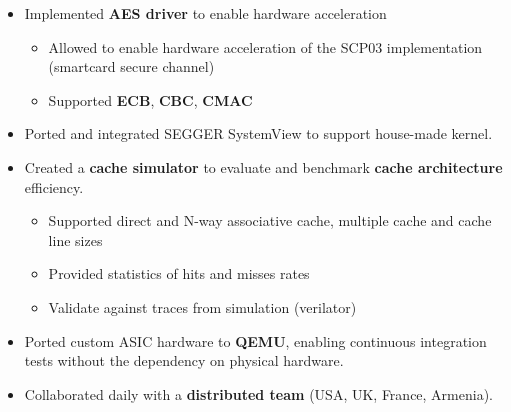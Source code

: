 \documentclass[10pt,a4paper]{altacv}
\begin{document}
\begin{paracol}{2}
\begin{itemize}
\begin{itemize}
\end{itemize}
\item Implemented \textbf{\textcolor{bold}{AES driver}} to enable hardware acceleration
\begin{itemize}
    \renewcommand{\labelitemii}{-} %
    \item Allowed to enable hardware acceleration of the SCP03 implementation (smartcard secure channel)
    \item Supported \textbf{\textcolor{bold}{ECB}}, \textbf{\textcolor{bold}{CBC}}, \textbf{\textcolor{bold}{CMAC}}
\end{itemize}
\item Ported and integrated SEGGER SystemView to support house-made kernel.
\item Created a \textbf{\textcolor{bold}{cache simulator}} to evaluate and benchmark \textbf{\textcolor{bold}{cache architecture}} efficiency.
\begin{itemize}
    \renewcommand{\labelitemii}{-} %
    \item Supported direct and N-way associative cache, multiple cache and cache line sizes 
    \item Provided statistics of hits and misses rates
    \item Validate against traces from simulation (verilator)
\end{itemize}
\item Ported custom ASIC hardware to \textbf{\textcolor{bold}{QEMU}}, enabling continuous integration tests without the dependency on physical hardware.
\item Collaborated daily with a \textbf{\textcolor{bold}{distributed team}} (USA, UK, France, Armenia).
\end{itemize}

\divider


\end{paracol}
\end{document}
